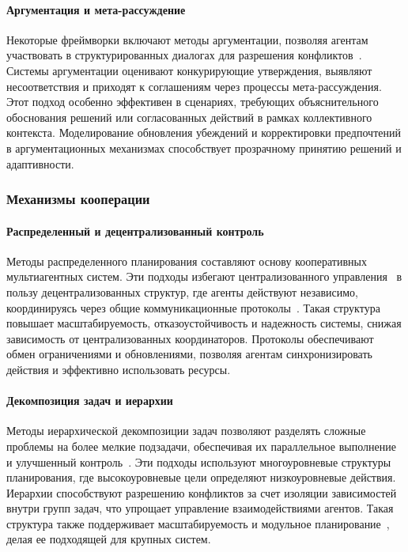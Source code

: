 \paragraph{Аргументация и мета-рассуждение}

Некоторые фреймворки включают методы аргументации,
позволяя агентам участвовать в структурированных диалогах для разрешения конфликтов~\cite{PAJARESFERRANDO201322,FERRANDO20171}.
Системы аргументации оценивают конкурирующие утверждения,
выявляют несоответствия и приходят к соглашениям через процессы мета-рассуждения.
Этот подход особенно эффективен в сценариях,
требующих объяснительного обоснования решений или согласованных действий в рамках коллективного контекста.
Моделирование обновления убеждений и корректировки предпочтений
в аргументационных механизмах способствует прозрачному принятию решений и адаптивности.

\subsubsection{Механизмы кооперации}

\paragraph{Распределенный и децентрализованный контроль}

Методы распределенного планирования составляют основу кооперативных мультиагентных систем.
Эти подходы избегают централизованного управления~\cite{DURFEE1988268,GRASTIEN2020103271,MA2021103823}
в пользу децентрализованных структур, где агенты действуют независимо,
координируясь через общие коммуникационные протоколы~\cite{ROSENSCHEIN1988187}.
Такая структура повышает масштабируемость, отказоустойчивость и надежность системы,
снижая зависимость от централизованных координаторов.
Протоколы обеспечивают обмен ограничениями и обновлениями, позволяя агентам синхронизировать действия и эффективно использовать ресурсы.

\paragraph{Декомпозиция задач и иерархии}

Методы иерархической декомпозиции задач позволяют разделять сложные проблемы на более мелкие подзадачи,
обеспечивая их параллельное выполнение и улучшенный контроль~\cite{JUNG1999149}.
Эти подходы используют многоуровневые структуры планирования,
где высокоуровневые цели определяют низкоуровневые действия.
Иерархии способствуют разрешению конфликтов за счет изоляции зависимостей внутри групп задач,
что упрощает управление взаимодействиями агентов.
Такая структура также поддерживает масштабируемость и модульное планирование~\cite{RODRIGUEZ201113005},
делая ее подходящей для крупных систем.

